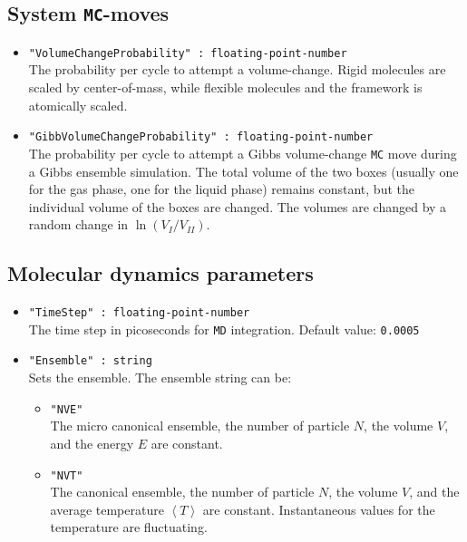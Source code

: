 \subsection{System \texttt{MC}-moves}

\begin{itemize}
\item{\verb+"VolumeChangeProbability" : floating-point-number+}\\
The probability per cycle to attempt a volume-change. 
Rigid molecules are scaled by center-of-mass, while flexible molecules and the framework is atomically scaled.
\item{\verb+"GibbVolumeChangeProbability" : floating-point-number+}\\
  The probability per cycle to attempt a Gibbs volume-change \texttt{MC} move during a Gibbs ensemble simulation. The total volume of the two boxes
(usually one for the gas phase, one for the liquid phase) remains constant, but the individual volume of the boxes are changed.
The volumes are changed by a random change in $\ln(V_I/V_{II})$.
\end{itemize}

\subsection{Molecular dynamics parameters}

\begin{itemize}
\item{\verb+"TimeStep" : floating-point-number+}\\
  The time step in picoseconds for \texttt{MD} integration. Default value: \verb+0.0005+
\item{\verb+"Ensemble" : string+}\\
Sets the ensemble. The ensemble string can be:
  \begin{itemize}
  \item{\verb+"NVE"+}\\
  The micro canonical ensemble, the number of particle $N$, the volume $V$, and the energy $E$ are constant.
  \item{\verb+"NVT"+}\\
  The canonical ensemble, the number of particle $N$, the volume $V$, and the average temperature $\left\langle T\right\rangle$
  are constant. Instantaneous values for the temperature are fluctuating.
  \end{itemize}
\end{itemize}

